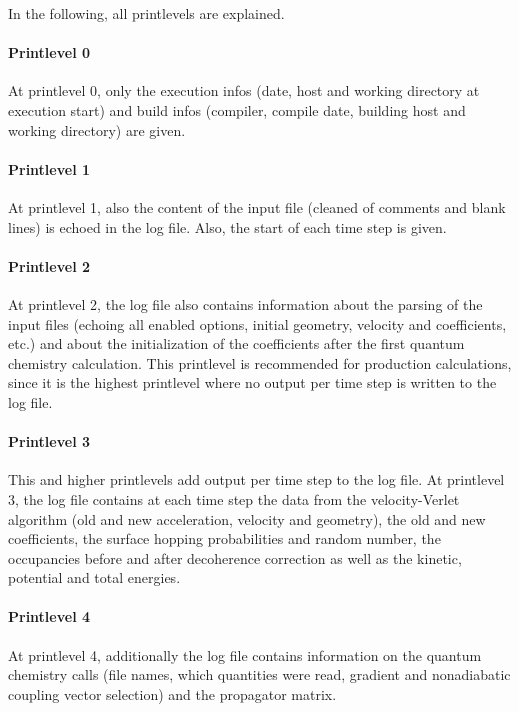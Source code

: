 \documentclass[a4paper,10pt,DIV=15,openany]{scrbook}
\begin{document}
In the following, all printlevels are explained.

\paragraph{Printlevel 0}

At printlevel 0, only the execution infos (date, host and working directory at execution start) and build infos (compiler, compile date, building host and working directory) are given.

\paragraph{Printlevel 1}

At printlevel 1, also the content of the input file (cleaned of comments and blank lines) is echoed in the log file. Also, the start of each time step is given.

\paragraph{Printlevel 2}

At printlevel 2, the log file also contains information about the parsing of the input files (echoing all enabled options, initial geometry, velocity and coefficients, etc.) and about the initialization of the coefficients after the first quantum chemistry calculation. This printlevel is recommended for production calculations, since it is the highest printlevel where no output per time step is written to the log file.

\paragraph{Printlevel 3}

This and higher printlevels add output per time step to the log file. At printlevel 3, the log file contains at each time step the data from the velocity-Verlet algorithm (old and new acceleration, velocity and geometry), the old and new coefficients, the surface hopping probabilities and random number, the occupancies before and after decoherence correction as well as the kinetic, potential and total energies.

\paragraph{Printlevel 4}

At printlevel 4, additionally the log file contains information on the quantum chemistry calls (file names, which quantities were read, gradient and nonadiabatic coupling vector selection) and the propagator matrix.
\end{document}
